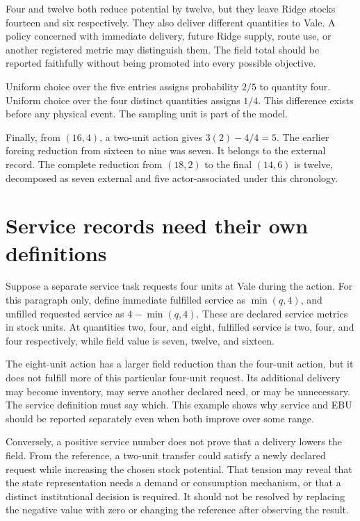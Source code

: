 Four and twelve both reduce potential by twelve, but they leave Ridge stocks fourteen and six respectively. They also deliver different quantities to Vale. A policy concerned with immediate delivery, future Ridge supply, route use, or another registered metric may distinguish them. The field total should be reported faithfully without being promoted into every possible objective.

Uniform choice over the five entries assigns probability \(2/5\) to quantity four. Uniform choice over the four distinct quantities assigns \(1/4\). This difference exists before any physical event. The sampling unit is part of the model.

Finally, from \((16,4)\), a two-unit action gives \(3(2)-4/4=5\). The earlier forcing reduction from sixteen to nine was seven. It belongs to the external record. The complete reduction from \((18,2)\) to the final \((14,6)\) is twelve, decomposed as seven external and five actor-associated under this chronology.

\section{Service records need their own definitions}

Suppose a separate service task requests four units at Vale during the action. For this paragraph only, define immediate fulfilled service as \(\min(q,4)\), and unfilled requested service as \(4-\min(q,4)\). These are declared service metrics in stock units. At quantities two, four, and eight, fulfilled service is two, four, and four respectively, while field value is seven, twelve, and sixteen.

The eight-unit action has a larger field reduction than the four-unit action, but it does not fulfill more of this particular four-unit request. Its additional delivery may become inventory, may serve another declared need, or may be unnecessary. The service definition must say which. This example shows why service and EBU should be reported separately even when both improve over some range.

Conversely, a positive service number does not prove that a delivery lowers the field. From the reference, a two-unit transfer could satisfy a newly declared request while increasing the chosen stock potential. That tension may reveal that the state representation needs a demand or consumption mechanism, or that a distinct institutional decision is required. It should not be resolved by replacing the negative value with zero or changing the reference after observing the result.


